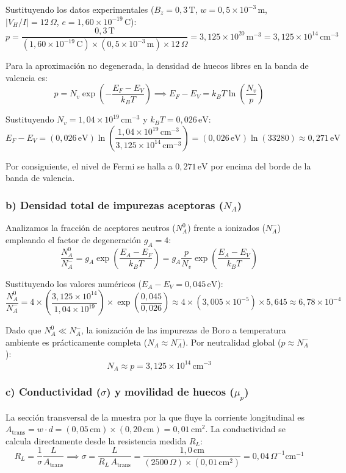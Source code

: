 \begin{problema}
Sustituyendo los datos experimentales ($B_z = 0,3\,\text{T}$, $w = 0,5 \times 10^{-3}\,\text{m}$, $|V_H / I| = 12\,\Omega$, $e = 1,60 \times 10^{-19}\,\text{C}$):
\[
p = \frac{0,3\,\text{T}}{(1,60 \times 10^{-19}\,\text{C}) \times (0,5 \times 10^{-3}\,\text{m}) \times 12\,\Omega} = 3,125 \times 10^{20}\,\text{m}^{-3} = 3,125 \times 10^{14}\,\text{cm}^{-3}
\]

Para la aproximación no degenerada, la densidad de huecos libres en la banda de valencia es:
\[
p = N_v \exp\left(-\frac{E_F - E_V}{k_B T}\right) \implies E_F - E_V = k_B T \ln\left(\frac{N_v}{p}\right)
\]

Sustituyendo $N_v = 1,04 \times 10^{19}\,\text{cm}^{-3}$ y $k_B T = 0,026\,\text{eV}$:
\[
E_F - E_V = (0,026\,\text{eV}) \ln\left(\frac{1,04 \times 10^{19}\,\text{cm}^{-3}}{3,125 \times 10^{14}\,\text{cm}^{-3}}\right) = (0,026\,\text{eV}) \ln(33280) \approx 0,271\,\text{eV}
\]

Por consiguiente, el nivel de Fermi se halla a $0,271\,\text{eV}$ por encima del borde de la banda de valencia.

\subsubsection*{b) Densidad total de impurezas aceptoras ($N_A$)}
Analizamos la fracción de aceptores neutros ($N_A^0$) frente a ionizados ($N_A^-$) empleando el factor de degeneración $g_A = 4$:
\[
\frac{N_A^0}{N_A^-} = g_A \exp\left(\frac{E_A - E_F}{k_B T}\right) = g_A \frac{p}{N_v} \exp\left(\frac{E_A - E_V}{k_B T}\right)
\]

Sustituyendo los valores numéricos ($E_A - E_V = 0,045\,\text{eV}$):
\[
\frac{N_A^0}{N_A^-} = 4 \times \left(\frac{3,125 \times 10^{14}}{1,04 \times 10^{19}}\right) \times \exp\left(\frac{0,045}{0,026}\right) \approx 4 \times (3,005 \times 10^{-5}) \times 5,645 \approx 6,78 \times 10^{-4}
\]

Dado que $N_A^0 \ll N_A^-$, la ionización de las impurezas de Boro a temperatura ambiente es prácticamente completa ($N_A \approx N_A^-$). Por neutralidad global ($p \approx N_A^-$):
\[
N_A \approx p = 3,125 \times 10^{14}\,\text{cm}^{-3}
\]

\subsubsection*{c) Conductividad ($\sigma$) y movilidad de huecos ($\mu_p$)}
La sección transversal de la muestra por la que fluye la corriente longitudinal es $A_{\text{trans}} = w \cdot d = (0,05\,\text{cm}) \times (0,20\,\text{cm}) = 0,01\,\text{cm}^2$. La conductividad se calcula directamente desde la resistencia medida $R_L$:
\[
R_L = \frac{1}{\sigma} \frac{L}{A_{\text{trans}}} \implies \sigma = \frac{L}{R_L \, A_{\text{trans}}} = \frac{1,0\,\text{cm}}{(2500\,\Omega) \times (0,01\,\text{cm}^2)} = 0,04\,\Omega^{-1}\text{cm}^{-1}
\]


\end{problema}
